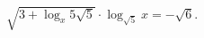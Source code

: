 \begin{ex}[type=equation]
	\begin{condition}
		$\sqrt{3 + \log_x 5\sqrt{5}}\cdot\log_{\sqrt{5}} x = -\sqrt{6}.$
	\end{condition}
\end{ex}